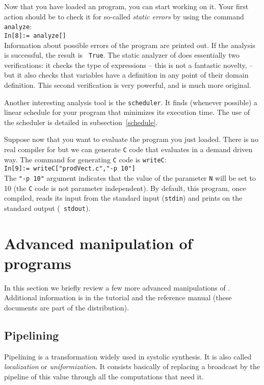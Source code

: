 Now that you have loaded an {\Alpha} program, you can start working on
it. Your first action should be to check it for so-called {\em static
errors} by using the command {\tt analyze}:\\ {\tt In[8]:=
analyze[]}\\ Information about possible errors of the {\Alpha} program
are printed out. If the analysis is successful, the result is {\tt
True}. The static analyzer of \alfa{} does essentially two verifications: 
it checks the type of expressions -- this is not a fantastic 
novelty, -- but it also checks that variables have a definition 
in any point of their domain definition. This second verification
is very powerful, and is much more original. 

Another interesting analysis tool is the {\tt scheduler}. It
finds (whenever possible) a linear schedule for your {\Alpha} program that
minimizes its execution time. The use of the scheduler is detailed in
subsection~\ref{schedule}. 

Suppose now that you want to evaluate the {\Alpha} program you just
loaded. There is no real compiler for {\Alpha} but we can generate
{\tt C} code that evaluates \alfa{} in a demand driven way. 
The command for generating {\tt C} code is {\tt writeC}:\\
{\tt In[9]:= writeC["prodVect.c","-p 10"] }\\ The {\tt "-p 10"}
argument indicates that the value of the parameter {\tt N} will be set
to 10 (the {\tt C} code is not parameter independent).
By
default, this program, once compiled, reads its input from the
standard input ({\tt stdin}) and prints on the standard output ({\tt
stdout}). 

\section{Advanced manipulation of {\Alpha} programs}
\label{chapstart:advanced}

In this section we briefly review a few more advanced manipulations of
{\Alpha}. Additional information is in the {\Alpha} tutorial and the
{\Alpha} reference manual (these documents are part of the \mmalfa{}
distribution).

\subsection{Pipelining}
Pipelining is a transformation widely used in systolic synthesis.
It is also called {\em localization} or {\em uniformization}.
It consists basically of replacing a broadcast 
by the pipeline of this value through all the computations that 
need it.  

